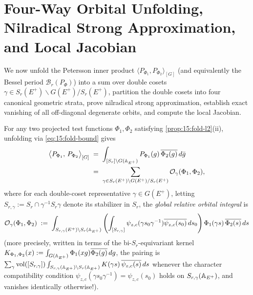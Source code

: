 \section{Four-Way Orbital Unfolding, Nilradical Strong Approximation, and Local Jacobian}
\label{sec:15:four-way-unfolding}

We now unfold the Petersson inner product $\langle P_{\Phi_1}, P_{\Phi_2} \rangle_{[G]}$ (and equivalently the Bessel period $\mathcal{B}_r(P_\Phi)$) into a sum over double cosets $\gamma \in S_r(E^+) \backslash G(E^+) / S_r(E^+)$, partition the double cosets into four canonical geometric strata, prove nilradical strong approximation, establish exact vanishing of all off-diagonal degenerate orbits, and compute the local Jacobian.

For any two projected test functions $\Phi_1, \Phi_2$ satisfying \cref{prop:15:fold-l2}(ii), unfolding via \eqref{eq:15:fold-bound} gives
\begin{align}
\label{eq:15:rtf-basic}
  \bigl\langle P_{\Phi_1},\, P_{\Phi_2} \bigr\rangle_{[G]}
  &\;=\; \int_{[S_r] \backslash G(\mathbb{A}_{E^+})} P_{\Phi_1}(g)\,\overline{\Phi_2(g)}\, d\bar{g} \notag\\
  &\;=\; \sum_{\gamma \in S_r(E^+) \backslash G(E^+) / S_r(E^+)} \mathcal{O}_\gamma(\Phi_1, \Phi_2),
\end{align}
where for each double-coset representative $\gamma \in G(E^+)$, letting $S_{r,\gamma} := S_r \cap \gamma^{-1} S_r \gamma$ denote its stabilizer in $S_r$, the \emph{global relative orbital integral} is
\begin{equation}
\label{eq:15:orbital-int}
  \mathcal{O}_\gamma(\Phi_1, \Phi_2) \;:=\;
  \int_{S_{r,\gamma}(E^+) \backslash S_r(\mathbb{A}_{E^+})} \left(\int_{[S_{r,\gamma}]} \psi_{z,c}(\gamma s_0 \gamma^{-1}) \overline{\psi_{z,c}(s_0)}\, ds_0\right)
  \Phi_1(\gamma s)\,\overline{\Phi_2(s)}\, ds
\end{equation}
(more precisely, written in terms of the bi-$S_r$-equivariant kernel $K_{\Phi_1, \Phi_2}(x) := \int_{G(\mathbb{A}_{E^+})} \Phi_1(x g)\overline{\Phi_2(g)}\, dg$, the pairing is $\sum_{\gamma} \operatorname{vol}([S_{r,\gamma}]) \int_{S_{r,\gamma}(\mathbb{A}_{E^+}) \backslash S_r(\mathbb{A}_{E^+})} K(\gamma s)\,\overline{\psi_{z,c}(s)}\, ds$ whenever the character compatibility condition $\psi_{z,c}(\gamma s_0 \gamma^{-1}) = \psi_{z,c}(s_0)$ holds on $S_{r,\gamma}(\mathbb{A}_{E^+})$, and vanishes identically otherwise!).

